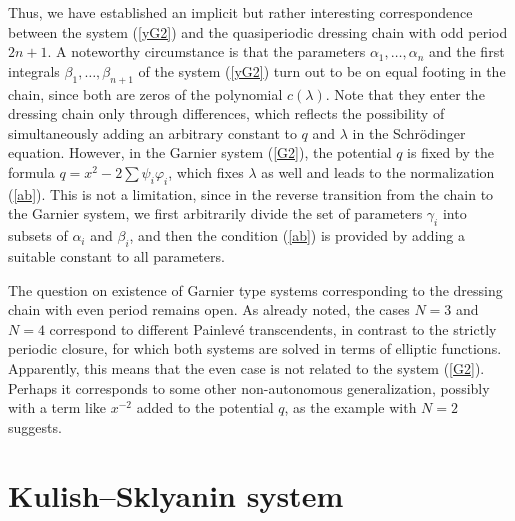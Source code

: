 \documentclass[11pt]{article}
\theoremstyle{plain}
\theoremstyle{definition}
\begin{document}
Thus, we have established an implicit but rather interesting correspondence between the system (\ref{yG2}) and the quasiperiodic dressing chain with odd period $2n+1$. A noteworthy circumstance is that the parameters $\alpha_1,\dots,\alpha_n$ and the first integrals $\beta_1,\dots,\beta_{n+1}$ of the system (\ref{yG2}) turn out to be on equal footing in the chain, since both are zeros of the polynomial $c(\lambda)$. Note that they enter the dressing chain only through differences, which reflects the possibility of simultaneously adding an arbitrary constant to $q$ and  $\lambda$ in the Schr\"odinger equation. However, in the Garnier system (\ref{G2}), the potential $q$ is fixed by the formula $q=x^2-2\sum\psi_i\varphi_i$, which fixes $\lambda$ as well and leads to the normalization (\ref{ab}). This is not a limitation, since in the reverse transition from the chain to the Garnier system, we first arbitrarily divide the set of parameters $\gamma_i$ into subsets of $\alpha_i$ and $\beta_i$, and then the condition (\ref{ab}) is provided by adding a suitable constant to all parameters.
 
The question on existence of Garnier type systems corresponding to the dressing chain with even period remains open. As already noted, the cases $N=3$ and $N=4$ correspond to different Painlev\'e transcendents, in contrast to the strictly periodic closure, for which both systems are solved in terms of elliptic functions. Apparently, this means that the even case is not related to the system (\ref{G2}). Perhaps it corresponds to some other non-autonomous generalization, possibly with a term like $x^{-2}$ added to the potential $q$, as the example with $N=2$ suggests.

\section{Kulish--Sklyanin system}\label{s:KS}
\end{document}
